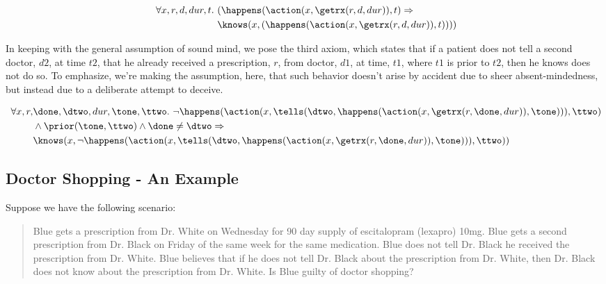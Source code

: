 \begin{footnotesize}
\begin{align*}
[A2] \ \forall x, r, d, dur, t . \ &(\happens(\action(x, \getrx(r, d, dur)), t) \Rightarrow \\
& \knows(x,(\happens(\action(x,\getrx(r,d,dur)), t))))
\end{align*}
\end{footnotesize}

In keeping with the general assumption of sound mind, we pose the third axiom, which states that if a patient does not tell a second doctor, $d2$, at time $t2$, that he already received a prescription, $r$, from doctor, $d1$, at time, $t1$, where $t1$ is prior to $t2$, then he knows does not do so.  To emphasize, we're making the assumption, here, that such behavior doesn't arise by accident due to sheer absent-mindedness, but instead due to a deliberate attempt to deceive.


\begin{footnotesize}
\begin{align*}
[A3] \ \forall x, r, &\done, \dtwo, dur, \tone, \ttwo . \ \neg \happens(\action(x,\tells(\dtwo,\happens(\action(x,\getrx(r,\done,dur)),\tone))),\ttwo) \\
& \wedge \prior(\tone,\ttwo) \wedge \done \neq \dtwo \Rightarrow \\
& \knows(x, \neg \happens(\action(x,\tells(\dtwo,\happens(\action(x,\getrx(r,\done,dur)),\tone))),\ttwo))
\end{align*}
\end{footnotesize}


\subsection{Doctor Shopping - An Example}

Suppose we have the following scenario:
\blockquote{Blue gets a prescription from Dr. White on Wednesday for 90 day supply of escitalopram (lexapro) 10mg.  Blue gets a second prescription from Dr. Black on Friday of the same week for the same medication.  Blue does not tell Dr. Black he received the prescription from Dr. White.  Blue believes that if he does not tell Dr. Black about the prescription from Dr. White, then Dr. Black does not know about the prescription from Dr. White.  Is Blue guilty of doctor shopping?}

